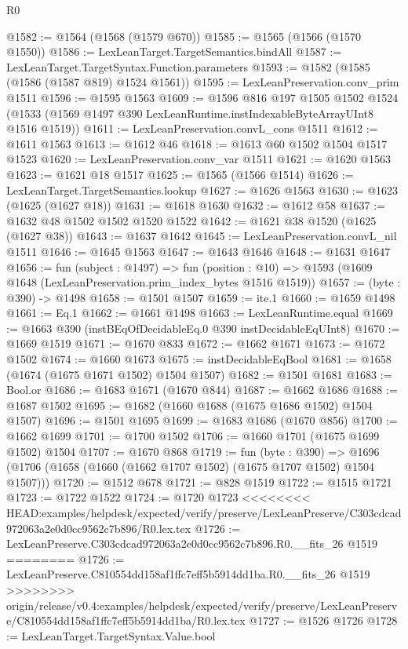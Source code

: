 \begin{lexlean}{R0}
\begin{coremodule}
{{{{{{{{{{{{{{{{{{{{{{{{{{{{{{{{{{{{{{{{{{{{{{{{{{{{{{{{{{{{{{{{{{{{{{{{{@1582 := @1564 (@1568 (@1579 @670))
@1585 := @1565 (@1566 (@1570 @1550))
@1586 := LexLeanTarget.TargetSemantics.bindAll
@1587 := LexLeanTarget.TargetSyntax.Function.parameters
@1593 := @1582 (@1585 (@1586 (@1587 @819) @1524 @1561))
@1595 := LexLeanPreservation.conv_prim @1511
@1596 := @1595 @1563
@1609 := @1596
    @816
    @197
    @1505
    @1502
    @1524
    (@1533 (@1569 @1497 @390 LexLeanRuntime.instIndexableByteArrayUInt8 @1516 @1519))
@1611 := LexLeanPreservation.convL_cons @1511
@1612 := @1611 @1563
@1613 := @1612 @46
@1618 := @1613 @60 @1502 @1504 @1517 @1523
@1620 := LexLeanPreservation.conv_var @1511
@1621 := @1620 @1563
@1623 := @1621 @18 @1517
@1625 := @1565 (@1566 @1514)
@1626 := LexLeanTarget.TargetSemantics.lookup
@1627 := @1626 @1563
@1630 := @1623 (@1625 (@1627 @18))
@1631 := @1618 @1630
@1632 := @1612 @58
@1637 := @1632 @48 @1502 @1502 @1520 @1522
@1642 := @1621 @38 @1520 (@1625 (@1627 @38))
@1643 := @1637 @1642
@1645 := LexLeanPreservation.convL_nil @1511
@1646 := @1645 @1563
@1647 := @1643 @1646
@1648 := @1631 @1647
@1656 := fun (subject : @1497) =>
  fun (position : @10) => @1593 (@1609 @1648 (LexLeanPreservation.prim_index_bytes @1516 @1519))
@1657 := (byte : @390) -> @1498
@1658 := @1501 @1507
@1659 := ite.{1}
@1660 := @1659 @1498
@1661 := Eq.{1}
@1662 := @1661 @1498
@1663 := LexLeanRuntime.equal
@1669 := @1663 @390 (instBEqOfDecidableEq.{0} @390 instDecidableEqUInt8)
@1670 := @1669 @1519
@1671 := @1670 @833
@1672 := @1662 @1671
@1673 := @1672 @1502
@1674 := @1660 @1673
@1675 := instDecidableEqBool
@1681 := @1658 (@1674 (@1675 @1671 @1502) @1504 @1507)
@1682 := @1501 @1681
@1683 := Bool.or
@1686 := @1683 @1671 (@1670 @844)
@1687 := @1662 @1686
@1688 := @1687 @1502
@1695 := @1682 (@1660 @1688 (@1675 @1686 @1502) @1504 @1507)
@1696 := @1501 @1695
@1699 := @1683 @1686 (@1670 @856)
@1700 := @1662 @1699
@1701 := @1700 @1502
@1706 := @1660 @1701 (@1675 @1699 @1502) @1504
@1707 := @1670 @868
@1719 := fun (byte : @390) =>
  @1696 (@1706 (@1658 (@1660 (@1662 @1707 @1502) (@1675 @1707 @1502) @1504 @1507)))
@1720 := @1512 @678
@1721 := @828 @1519
@1722 := @1515 @1721
@1723 := @1722 @1522
@1724 := @1720 @1723
<<<<<<<< HEAD:examples/helpdesk/expected/verify/preserve/LexLeanPreserve/C303cdcad972063a2e0d0cc9562c7b896/R0.lex.tex
@1726 := LexLeanPreserve.C303cdcad972063a2e0d0cc9562c7b896.R0.__fits_26 @1519
========
@1726 := LexLeanPreserve.C810554dd158af1ffc7eff5b5914dd1ba.R0.__fits_26 @1519
>>>>>>>> origin/release/v0.4:examples/helpdesk/expected/verify/preserve/LexLeanPreserve/C810554dd158af1ffc7eff5b5914dd1ba/R0.lex.tex
@1727 := @1526 @1726
@1728 := LexLeanTarget.TargetSyntax.Value.bool
}}}}}}}}}}}}}}}}}}}}}}}}}}}}}}}}}}}}}}}}}}}}}}}}}}}}}}}}}}}}}}}}}}}}}}}}}
\end{coremodule}
\end{lexlean}
